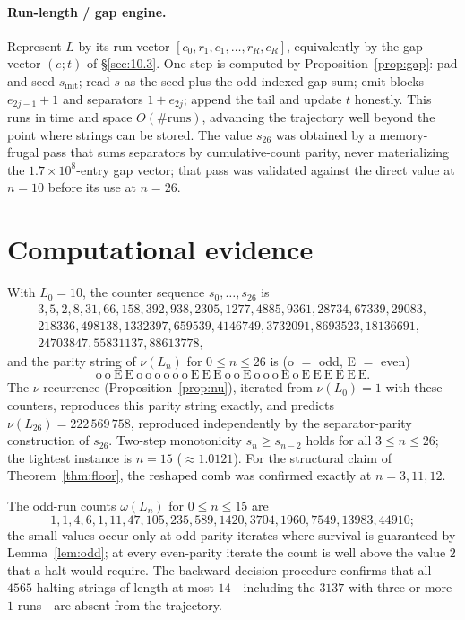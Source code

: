 \documentclass[11pt,reqno]{amsart}
\theoremstyle{plain}
\theoremstyle{definition}
\theoremstyle{remark}
\begin{document}
\paragraph{Run-length / gap engine.} Represent $L$ by its run vector $[c_0,r_1,c_1,\dots,r_R,c_R]$, equivalently by the gap-vector $(e;t)$ of \S\ref{sec:10.3}. One step is computed by Proposition~\ref{prop:gap}: pad and seed $s_{\mathrm{init}}$; read $s$ as the seed plus the odd-indexed gap sum; emit blocks $e_{2j-1}+1$ and separators $1+e_{2j}$; append the tail and update $t$ honestly. This runs in time and space $O(\#\text{runs})$, advancing the trajectory well beyond the point where strings can be stored. The value $s_{26}$ was obtained by a memory-frugal pass that sums separators by cumulative-count parity, never materializing the $1.7\times 10^8$-entry gap vector; that pass was validated against the direct value at $n=10$ before its use at $n=26$.

\section{Computational evidence}\label{app:evidence}
With $L_0=10$, the counter sequence $s_0,\dots,s_{26}$ is
\begin{multline*}
3,5,2,8,31,66,158,392,938,2305,1277,4885,9361,28734,67339,29083,\\
218336,498138,1332397,659539,4146749,3732091,8693523,18136691,\\
24703847,55831137,88613778,
\end{multline*}
and the parity string of $\nu(L_n)$ for $0\le n\le 26$ is (o $=$ odd, E $=$ even)
\[ \mathrm{o\ o\ E\ E\ o\ o\ o\ o\ o\ o\ E\ E\ E\ o\ o\ E\ o\ o\ o\ E\ o\ E\ E\ E\ E\ E\ E.} \]
The $\nu$-recurrence (Proposition~\ref{prop:nu}), iterated from $\nu(L_0)=1$ with these counters, reproduces this parity string exactly, and predicts $\nu(L_{26})=222\,569\,758$, reproduced independently by the separator-parity construction of $s_{26}$. Two-step monotonicity $s_n\ge s_{n-2}$ holds for all $3\le n\le 26$; the tightest instance is $n=15$ ($\approx 1.0121$). For the structural claim of Theorem~\ref{thm:floor}, the reshaped comb was confirmed exactly at $n=3,11,12$.

The odd-run counts $\omega(L_n)$ for $0\le n\le 15$ are
\[ 1,1,4,6,1,11,47,105,235,589,1420,3704,1960,7549,13983,44910; \]
the small values occur only at odd-parity iterates where survival is guaranteed by Lemma~\ref{lem:odd}; at every even-parity iterate the count is well above the value $2$ that a halt would require. The backward decision procedure confirms that all $4565$ halting strings of length at most $14$---including the $3137$ with three or more $1$-runs---are absent from the trajectory.
\end{document}
